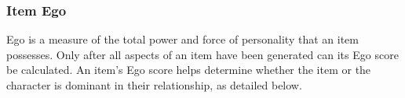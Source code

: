 \subsubsection{Item Ego}
Ego is a measure of the total power and force of personality that an item possesses. Only after all aspects of an item have been generated can its Ego score be calculated. An item's Ego score helps determine whether the item or the character is dominant in their relationship, as detailed below.

